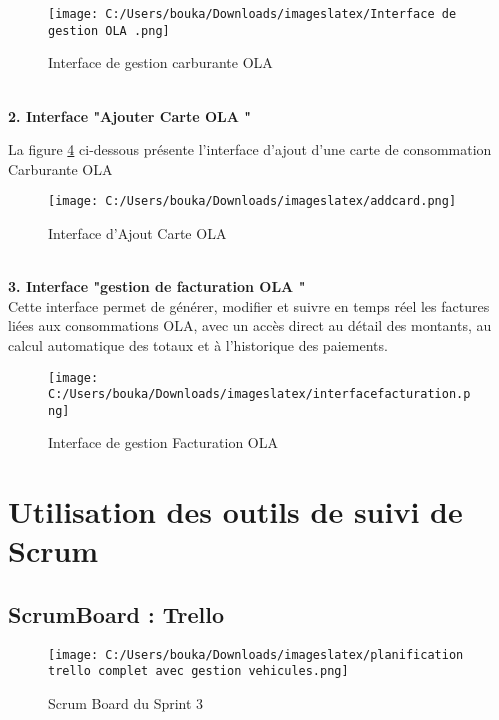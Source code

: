 \documentclass[a4paper,11pt]{report}
\begin{document}
\begin{figure}[H]
  \centering
  \texttt{[image: C:/Users/bouka/Downloads/imageslatex/Interface de gestion OLA .png]}
  \caption{Interface de gestion carburante OLA}
  \label{fig:clone-result}
\end{figure}




\textbf{      \\ 2. Interface  "Ajouter Carte OLA "}

La figure \ref{fig:clone-result} ci-dessous présente l’interface d'ajout d'une carte de consommation Carburante OLA

\begin{figure}[H]
  \centering
  \texttt{[image: C:/Users/bouka/Downloads/imageslatex/addcard.png]}
  \caption{Interface d'Ajout Carte OLA}
  \label{fig:clone-result}
\end{figure}

\textbf{      \\ 3. Interface  "gestion de facturation OLA "}
\\
Cette interface permet de générer, modifier et suivre en temps réel les factures liées aux consommations OLA, avec un accès direct au détail des montants, au calcul automatique des totaux et à l’historique des paiements.
\begin{figure}[H]
  \centering
  \texttt{[image: C:/Users/bouka/Downloads/imageslatex/interfacefacturation.png]}
  \caption{Interface de gestion Facturation OLA}
  \label{fig:clone-result}
\end{figure}











\section{Utilisation des outils de suivi de Scrum}

\subsection{ScrumBoard : Trello}


\begin{figure}[H]
  \centering
  \texttt{[image: C:/Users/bouka/Downloads/imageslatex/planification trello complet avec gestion vehicules.png]}
  \caption{Scrum Board du Sprint 3}
  \label{fig:clone-result}
\end{figure}
\end{document}
